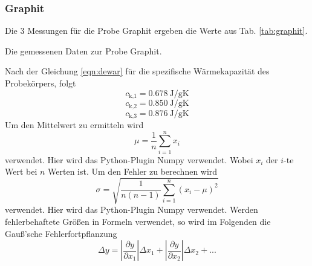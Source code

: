 \subsubsection{Graphit}
Die 3 Messungen für die Probe Graphit ergeben die Werte aus Tab. \ref{tab:graphit}.
\begin{table}
    \centering
    \caption{Die gemessenen Daten zur Probe Graphit. }
    \label{tab:graphit}  
\end{table}
Nach der Gleichung \eqref{eqn:dewar} für die spezifische Wärmekapazität des Probekörpers, folgt
\begin{equation}
    c_\text{k,1} = \SI{0.678}{\joule/\gram\kelvin}
\end{equation}
\begin{equation}
    c_\text{k,2} = \SI{0.850}{\joule/\gram\kelvin}
\end{equation}
\begin{equation}
    c_\text{k,3} = \SI{0.876}{\joule/\gram\kelvin}
\end{equation}
Um den Mittelwert zu ermitteln wird
\begin{equation}
    \mu = \frac{1}{n} \sum_{i=1}^n x_i
    \label{eqn:mittel}
\end{equation}
verwendet. Hier wird das Python-Plugin Numpy \cite{numpy} verwendet.
Wobei $x_i$ der $i$-te Wert bei $n$ Werten ist.
Um den Fehler zu berechnen wird
\begin{equation}
    \sigma = \sqrt{\frac{1}{n(n-1)} \sum_{i=1}^n (x_i - \mu)^2}
    \label{eqn:fehler}
\end{equation}
verwendet. Hier wird das Python-Plugin Numpy \cite{numpy} verwendet.
Werden fehlerbehaftete Größen in Formeln verwendet, so wird im Folgenden die Gauß'sche Fehlerfortpflanzung 
\begin{equation}
    \Delta y = \left|\frac{\partial y}{\partial x_1}\right| \Delta x_1 + \left|\frac{\partial y}{\partial x_2}\right| \Delta x_2 + ...
\end{equation}
